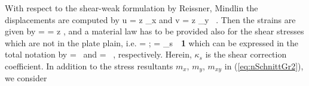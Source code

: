 With respect to the shear-weak formulation by {\sc Reissner, Mindlin} 
the displacements are computed by 
\eb
u = z \beta_x \qquad \mbox{and} \qquad v = z \beta_y \, . 
\ee
Then the strains are given by 
\eb
\Bvarepsilon =  = z \Bkappa \;,
\ee
and a material law has to be provided also for the shear stresses 
which are not in the plate plain, i.e. 
\eb
{} =  
 \; ; \quad {} = \kappa_s \,\mu\, {\bf 1} 
\ee
which can be expressed in the total notation by 
\eb
\Bsigma = {\bf \IC}\, \Bvarepsilon \qquad \mbox{and} \qquad
\Btau = \bG \Bgamma \, , 
\ee
respectively. 
Herein, $\kappa_s$ is the shear correction coefficient. 
In addition to the stress resultants $m_x$, $m_y$, $m_{xy}$ 
in (\ref{eq:nSchnittGr2}), we consider 
